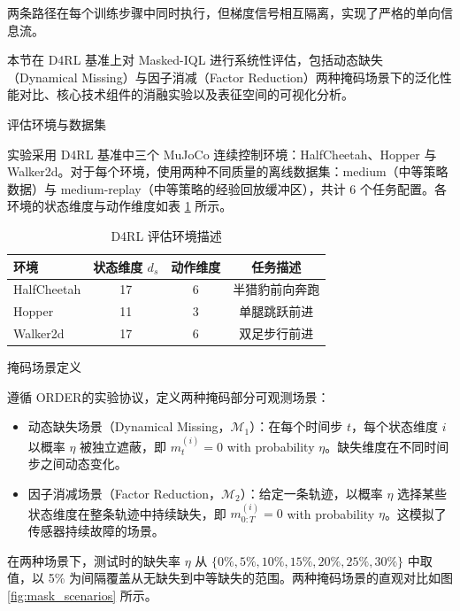 两条路径在每个训练步骤中同时执行，但梯度信号相互隔离，实现了严格的单向信息流。


本节在 D4RL 基准\cite{fu2020d4rl}上对 Masked-IQL 进行系统性评估，包括动态缺失（Dynamical Missing）与因子消减（Factor Reduction）两种掩码场景下的泛化性能对比、核心技术组件的消融实验以及表征空间的可视化分析。


评估环境与数据集

实验采用 D4RL 基准\cite{fu2020d4rl}中三个 MuJoCo 连续控制环境：HalfCheetah、Hopper 与 Walker2d。对于每个环境，使用两种不同质量的离线数据集：medium（中等策略数据）与 medium-replay（中等策略的经验回放缓冲区），共计 6 个任务配置。各环境的状态维度与动作维度如表 \ref{tab:d4rl_envs} 所示。

\begin{table}[htbp]
    \centering
    \caption{D4RL 评估环境描述}
    \label{tab:d4rl_envs}
    \begin{tabular}{lccc}
        \hline
        环境 & 状态维度 $d_s$ & 动作维度 & 任务描述 \\
        \hline
        HalfCheetah & 17 & 6 & 半猎豹前向奔跑 \\
        Hopper      & 11 & 3 & 单腿跳跃前进 \\
        Walker2d    & 17 & 6 & 双足步行前进 \\
        \hline
    \end{tabular}
\end{table}

掩码场景定义

遵循 ORDER\cite{gu2023order}的实验协议，定义两种掩码部分可观测场景：

\begin{itemize}
    \item 动态缺失场景（Dynamical Missing，$\mathcal{M}_1$）：在每个时间步 $t$，每个状态维度 $i$ 以概率 $\eta$ 被独立遮蔽，即 $m_t^{(i)} = 0$ with probability $\eta$。缺失维度在不同时间步之间动态变化。
    \item 因子消减场景（Factor Reduction，$\mathcal{M}_2$）：给定一条轨迹，以概率 $\eta$ 选择某些状态维度在整条轨迹中持续缺失，即 $m_{0:T}^{(i)} = 0$ with probability $\eta$。这模拟了传感器持续故障的场景。
\end{itemize}

在两种场景下，测试时的缺失率 $\eta$ 从 $\{0\%, 5\%, 10\%, 15\%, 20\%, 25\%, 30\%\}$ 中取值，以 5\% 为间隔覆盖从无缺失到中等缺失的范围。两种掩码场景的直观对比如图 \ref{fig:mask_scenarios} 所示。

